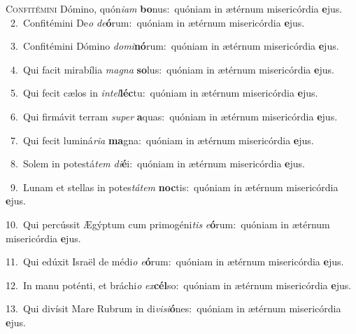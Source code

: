 \lettrine{\initial\textcolor{\initialcolor}{C}}{onfitémini} Dómino, quón\-\textit{i}\-\textit{am} \textbf{bo}\-nus:~\star quóniam in ætérnum misericórdia \textbf{e}\-jus.\\
{\numbfont\textcolor{\numbcolor}{~2.}}~Confitémini De\textit{o} \textit{de}\-\textbf{ó}rum:~\star quóniam in ætérnum misericórdia \textbf{e}\-jus.\par
{\numbfont\textcolor{\numbcolor}{~3.}}~Confitémini Dómino \textit{do}\-\textit{mi}\textbf{nó}rum:~\star quóniam in ætérnum misericórdia \textbf{e}\-jus.\par
{\numbfont\textcolor{\numbcolor}{~4.}}~Qui facit mirabília \textit{ma}\-\textit{gna} \textbf{so}\-lus:~\star quóniam in ætérnum misericórdia \textbf{e}\-jus.\par
{\numbfont\textcolor{\numbcolor}{~5.}}~Qui fecit cælos in \textit{in}\-\textit{tel}\textbf{léc}tu:~\star quóniam in ætérnum misericórdia \textbf{e}\-jus.\par
{\numbfont\textcolor{\numbcolor}{~6.}}~Qui firmávit terram \textit{su}\-\textit{per} \textbf{a}\-quas:~\star quóniam in ætérnum misericórdia \textbf{e}\-jus.\par
{\numbfont\textcolor{\numbcolor}{~7.}}~Qui fecit luminá\-\textit{ri}\-\textit{a} \textbf{ma}\-gna:~\star quóniam in ætérnum misericórdia \textbf{e}\-jus.\par
{\numbfont\textcolor{\numbcolor}{~8.}}~Solem in potestá\textit{tem} \textit{di}\-\textbf{é}i:~\star quóniam in ætérnum misericórdia \textbf{e}\-jus.\par
{\numbfont\textcolor{\numbcolor}{~9.}}~Lunam et stellas in potes\-\textit{tá}\-\textit{tem} \textbf{noc}\-tis:~\star quóniam in ætérnum misericórdia \textbf{e}\-jus.\par
{\numbfont\textcolor{\numbcolor}{10.}}~Qui percússit Ægýptum cum primogéni\textit{tis} \textit{e}\-\textbf{ó}rum:~\star quóniam in ætérnum misericórdia \textbf{e}\-jus.\par
{\numbfont\textcolor{\numbcolor}{11.}}~Qui edúxit Israël de médi\textit{o} \textit{e}\-\textbf{ó}rum:~\star quóniam in ætérnum misericórdia \textbf{e}\-jus.\par
{\numbfont\textcolor{\numbcolor}{12.}}~In manu poténti, et bráchi\textit{o} \textit{ex}\-\textbf{cél}so:~\star quóniam in ætérnum misericórdia \textbf{e}\-jus.\par
{\numbfont\textcolor{\numbcolor}{13.}}~Qui divísit Mare Rubrum in di\-\textit{vi}\-\textit{si}\textbf{ó}nes:~\star quóniam in ætérnum misericórdia \textbf{e}\-jus.\par
